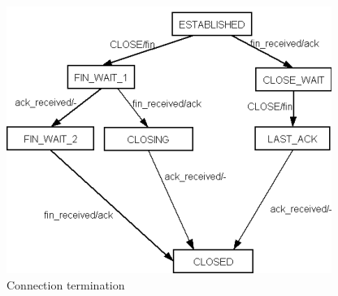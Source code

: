 \documentclass[11pt]{article}
\begin{document}
\begin{figure}
\begin{center}
\includegraphics{termination.png}
\end{center}
\caption{Connection termination}
\label{figuur:termination}
\end{figure}
\end{document}
